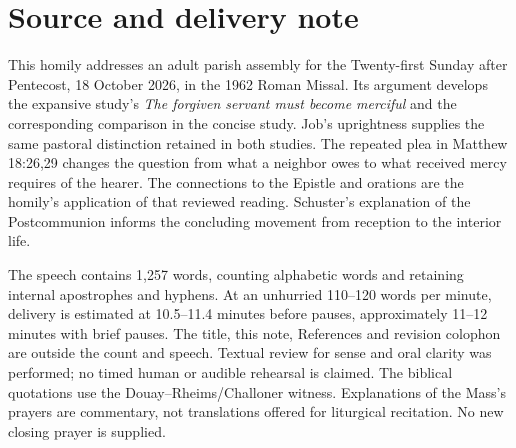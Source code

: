 \section{Source and delivery note}
This homily addresses an adult parish assembly for the Twenty-first Sunday
after Pentecost, 18 October 2026, in the 1962 Roman Missal. Its argument
develops the expansive study's \textit{The forgiven servant must become
merciful} and the corresponding comparison in the concise study. Job's
uprightness supplies the same pastoral distinction retained in both
studies. The repeated plea in Matthew 18:26,29 changes the question from
what a neighbor owes to what received mercy requires of the hearer.
The connections to the Epistle and orations are the homily's application
of that reviewed reading.
Schuster's explanation of the Postcommunion informs the concluding
movement from reception to the interior life.

The speech contains 1,257 words, counting alphabetic words and retaining
internal apostrophes and hyphens. At an unhurried 110--120 words per minute,
delivery is estimated at 10.5--11.4 minutes before pauses, approximately
11--12 minutes with brief pauses. The title, this note, References and
revision colophon are outside the count and speech. Textual review for
sense and oral clarity was performed; no timed human or audible rehearsal
is claimed. The biblical quotations use the
Douay--Rheims/Challoner witness. Explanations of the Mass's prayers are
commentary, not translations offered for liturgical recitation. No new
closing prayer is supplied.

